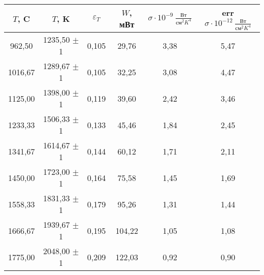 \begin{table}[h!]
    \begin{tabular}{|c|c|c|c|c|c|}
    \hline
    $T$, C       & $T$, K            & $\varepsilon_T$    & $W$, мВт      & $\sigma \cdot 10^{-9} ~ \frac{\text{Вт}}{\text{см}^2 K^4}$  & err $\sigma \cdot 10^{-12} ~ \frac{\text{Вт}}{\text{см}^2 K^4}$ \\ \hline
    962,50       & 1235,50 $\pm$ 1   & 0,105              & 29,76         & 3,38                                                        & 5,47                                                            \\ \hline
    1016,67      & 1289,67 $\pm$ 1   & 0,105              & 32,25         & 3,08                                                        & 4,47                                                            \\ \hline
    1125,00      & 1398,00 $\pm$ 1   & 0,119              & 39,60         & 2,42                                                        & 3,46                                                            \\ \hline
    1233,33      & 1506,33 $\pm$ 1   & 0,133              & 45,46         & 1,84                                                        & 2,45                                                            \\ \hline
    1341,67      & 1614,67 $\pm$ 1   & 0,144              & 60,12         & 1,71                                                        & 2,11                                                            \\ \hline
    1450,00      & 1723,00 $\pm$ 1   & 0,164              & 75,58         & 1,45                                                        & 1,69                                                            \\ \hline
    1558,33      & 1831,33 $\pm$ 1   & 0,179              & 95,26         & 1,31                                                        & 1,44                                                            \\ \hline
    1666,67      & 1939,67 $\pm$ 1   & 0,195              & 104,22        & 1,05                                                        & 1,08                                                            \\ \hline
    1775,00      & 2048,00 $\pm$ 1   & 0,209              & 122,03        & 0,92                                                        & 0,90                                                            \\ \hline
    \end{tabular}
    \centering
    \caption{}
    \label{tabel:calculations}
\end{table}
